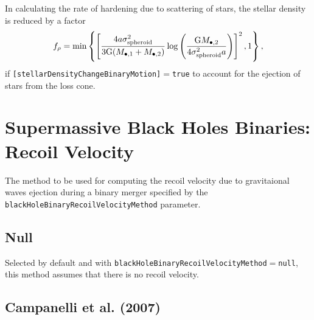 In calculating the rate of hardening due to scattering of stars, the stellar density is reduced by a factor \citep{volonteri_assembly_2003}
\begin{equation}
f_\rho = \hbox{min}\left\{ \left[ { 4 a \sigma_{\rm spheroid}^2 \over 3 {\rm G} (M_{\bullet, 1}+M_{\bullet, 2})} \log\left({{\rm G} M_{\bullet, 2} \over 4 \sigma_{\rm spheroid}^2  a }\right) \right]^2 , 1 \right\},
\end{equation}
if {\tt [stellarDensityChangeBinaryMotion]}$=${\tt true} to account for the ejection of stars from the loss cone.

\section{Supermassive Black Holes Binaries: Recoil Velocity}\label{sec:binaryBlackHoleRecoil}

The method to be used for computing the recoil velocity due to gravitaional waves ejection during a binary merger specified by the {\tt blackHoleBinaryRecoilVelocityMethod} parameter.

\subsection{Null}

Selected by default and with {\tt blackHoleBinaryRecoilVelocityMethod}$=${\tt null}, this method assumes that there is no recoil velocity.

\subsection{Campanelli et al. (2007)}

